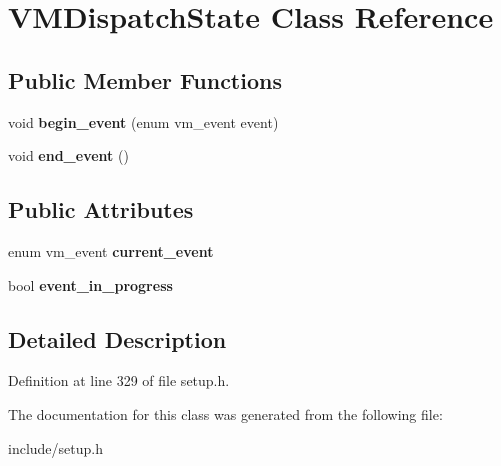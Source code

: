 \hypertarget{classVMDispatchState}{\section{V\-M\-Dispatch\-State Class Reference}
\label{classVMDispatchState}
}
\subsection*{Public Member Functions}
\begin{DoxyCompactItemize}
\item 
\hypertarget{classVMDispatchState_a3a0362f365280487cf9d34390ed0b2dc}{void {\bfseries begin\-\_\-event} (enum vm\-\_\-event event)}\label{classVMDispatchState_a3a0362f365280487cf9d34390ed0b2dc}

\item 
\hypertarget{classVMDispatchState_ac8a6709d68dbc4bf1a460292d52beab0}{void {\bfseries end\-\_\-event} ()}\label{classVMDispatchState_ac8a6709d68dbc4bf1a460292d52beab0}

\end{DoxyCompactItemize}
\subsection*{Public Attributes}
\begin{DoxyCompactItemize}
\item 
\hypertarget{classVMDispatchState_a0a92ac377b1d3e68d8dd3af2c8c433ba}{enum vm\-\_\-event {\bfseries current\-\_\-event}}\label{classVMDispatchState_a0a92ac377b1d3e68d8dd3af2c8c433ba}

\item 
\hypertarget{classVMDispatchState_a46c3a4522f352e7da32a6553fd27a471}{bool {\bfseries event\-\_\-in\-\_\-progress}}\label{classVMDispatchState_a46c3a4522f352e7da32a6553fd27a471}

\end{DoxyCompactItemize}


\subsection{Detailed Description}


Definition at line 329 of file setup.\-h.



The documentation for this class was generated from the following file\-:\begin{DoxyCompactItemize}
\item 
include/setup.\-h\end{DoxyCompactItemize}
